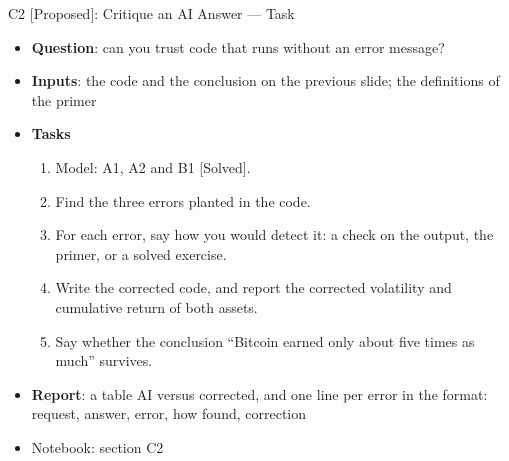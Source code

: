 \begin{frame}{C2 [Proposed]: Critique an AI Answer --- Task}
\itemsize{\small}
\begin{itemize}
\item \textbf{Question}: can you trust code that runs without an error message?
\item \textbf{Inputs}: the code and the conclusion on the previous slide; the definitions of the primer
\item \textbf{Tasks}
\begin{enumerate}
    \item Model: A1, A2 and B1 [Solved].
    \item Find the three errors planted in the code.
    \item For each error, say how you would detect it: a check on the output, the primer, or a solved exercise.
    \item Write the corrected code, and report the corrected volatility and cumulative return of both assets.
    \item Say whether the conclusion ``Bitcoin earned only about five times as much'' survives.
\end{enumerate}
\item \textbf{Report}: a table AI versus corrected, and one line per error in the format: request, answer, error, how found, correction
\item Notebook: section C2
\end{itemize}
\end{frame}

